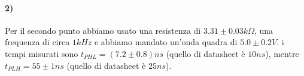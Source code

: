 \documentclass{article}
\begin{document}
\paragraph{2)}
	Per il secondo punto abbiamo usato una resistenza di $3.31\pm0.03 k\Omega$, una frequenza di circa $1kHz$ e abbiamo mandato un'onda quadra di $5.0\pm0.2 V$.
	i tempi misurati sono $t_{PHL}=(7.2\pm0.8)ns$ (quello di datasheet è $10ns$), mentre $t_{PLH}=55\pm 1 ns$ (quello di datasheet è $25ns$).
	
	

	
\end{document}
